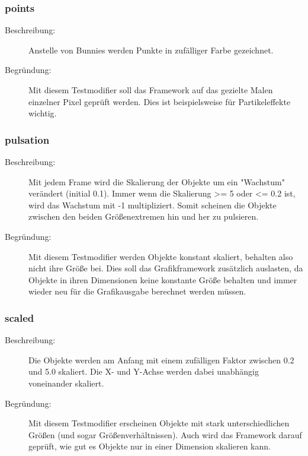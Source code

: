 \subsubsection{points}
\begin{description}
\item[Beschreibung:] Anstelle von Bunnies werden Punkte in zufälliger Farbe gezeichnet. \\
\item[Begründung:] Mit diesem Testmodifier soll das Framework auf das gezielte Malen einzelner Pixel geprüft werden. Dies ist beispielsweise für Partikeleffekte wichtig.
\end{description}

\subsubsection{pulsation}
\begin{description}
\item[Beschreibung:] Mit jedem Frame wird die Skalierung der Objekte um ein "Wachstum" verändert (initial 0.1). Immer wenn die Skalierung \textgreater= 5 oder \textless= 0.2 ist, wird das Wachstum mit -1 multipliziert. Somit scheinen die Objekte zwischen den beiden Größenextremen hin und her zu pulsieren. \\
\item[Begründung:] Mit diesem Testmodifier werden Objekte konstant skaliert, behalten also nicht ihre Größe bei. Dies soll das Grafikframework zusätzlich auslasten, da Objekte in ihren Dimensionen keine konstante Größe behalten und immer wieder neu für die Grafikausgabe berechnet werden müssen.
\end{description}

\subsubsection{scaled}
\begin{description}
\item[Beschreibung:] Die Objekte werden am Anfang mit einem zufälligen Faktor zwischen 0.2 und 5.0 skaliert. Die X- und Y-Achse werden dabei unabhängig voneinander skaliert. \\
\item[Begründung:] Mit diesem Testmodifier erscheinen Objekte mit stark unterschiedlichen Größen (und sogar Größenverhältnissen). Auch wird das Framework darauf geprüft, wie gut es Objekte nur in einer Dimension skalieren kann.
\end{description}

